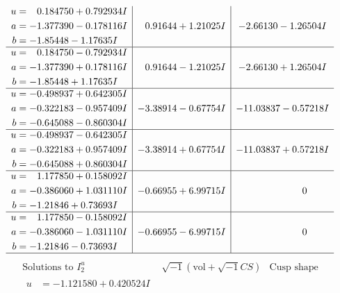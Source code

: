 \documentclass[1p]{elsarticle_modified}
\theoremstyle{definition}
\newcommand{\I}{\sqrt{-1}}
\begin{document}
$$\begin{array}{c|c|c}
\begin{aligned}
u &= \phantom{-}0.184750 + 0.792934 I \\
a &= -1.377390 - 0.178116 I \\
b &= -1.85448 - 1.17635 I\end{aligned}
 & \phantom{-}0.91644 + 1.21025 I & -2.66130 - 1.26504 I \\ \hline\begin{aligned}
u &= \phantom{-}0.184750 - 0.792934 I \\
a &= -1.377390 + 0.178116 I \\
b &= -1.85448 + 1.17635 I\end{aligned}
 & \phantom{-}0.91644 - 1.21025 I & -2.66130 + 1.26504 I \\ \hline\begin{aligned}
u &= -0.498937 + 0.642305 I \\
a &= -0.322183 - 0.957409 I \\
b &= -0.645088 - 0.860304 I\end{aligned}
 & -3.38914 - 0.67754 I & -11.03837 - 0.57218 I \\ \hline\begin{aligned}
u &= -0.498937 - 0.642305 I \\
a &= -0.322183 + 0.957409 I \\
b &= -0.645088 + 0.860304 I\end{aligned}
 & -3.38914 + 0.67754 I & -11.03837 + 0.57218 I \\ \hline\begin{aligned}
u &= \phantom{-}1.177850 + 0.158092 I \\
a &= -0.386060 + 1.031110 I \\
b &= -1.21846 + 0.73693 I\end{aligned}
 & -0.66955 + 6.99715 I & \phantom{-0.000000 } 0 \\ \hline\begin{aligned}
u &= \phantom{-}1.177850 - 0.158092 I \\
a &= -0.386060 - 1.031110 I \\
b &= -1.21846 - 0.73693 I\end{aligned}
 & -0.66955 - 6.99715 I & \phantom{-0.000000 } 0\\
 \hline 
 \end{array}$$\newpage$$\begin{array}{c|c|c}  
\text{Solutions to }I^u_{2}& \I (\text{vol} + \sqrt{-1}CS) & \text{Cusp shape}\\
 \hline 
\begin{aligned}
u &= -1.121580 + 0.420524 I \\

\end{aligned}
\end{array}$$
\end{document}
